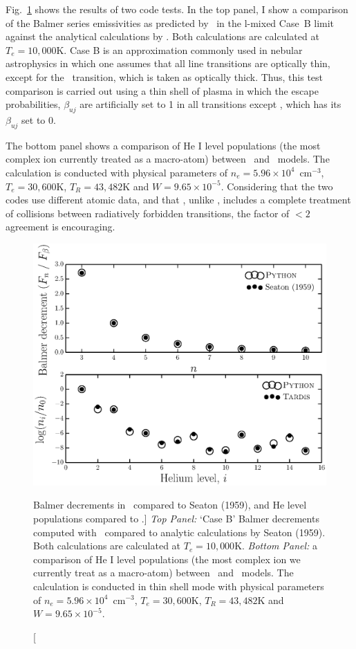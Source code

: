 Fig.~\ref{fig:caseb_tests} shows the results of two code tests. 
In the top panel, I show a comparison of the Balmer series 
emissivities as predicted by \py\ in the l-mixed Case~B limit against the
analytical calculations by \cite{seaton1959}. 
Both calculations are calculated at $T_e=10,000$K.
Case B is an approximation commonly used in nebular astrophysics 
\citep[see e.g.][]{osterbrock} in which
one assumes that all line transitions are optically thin, except
for the \la\ transition, which is taken as optically thick.
Thus, this test comparison is carried out using a thin shell
of plasma in which the escape probabilities, $\beta_{uj}$ 
are artificially set to 1 in all transitions except \la, which
has its $\beta_{uj}$ set to 0.

The bottom panel shows a comparison of He I level populations 
(the most complex ion currently 
treated as a macro-atom) between \py\ and \tar\ models.
The calculation is conducted with physical parameters of $n_e=5.96\times10^4$~cm$^{-3}$,
$T_e=30,600$K, $T_R=43,482$K and $W=9.65\times10^{-5}$. 
Considering that the two codes use different atomic data, and that
\tar, unlike \py, includes a 
complete treatment of collisions between 
radiatively forbidden transitions, the factor of 
$<2$ agreement is encouraging. 
\index{\tar}
\begin{figure}
\centering
\includegraphics[width=1.0\textwidth]{figures/05-cvpaper/fig_caseb_tardis.eps}
\caption
[Balmer decrements in \py\ compared to Seaton (1959), and He level populations
compared to \tar.]
{
{\sl Top Panel:} `Case B' Balmer decrements computed 
with \py\ compared to analytic calculations
by Seaton (1959). Both calculations are calculated at $T_e=10,000$K.
{\sl Bottom Panel:}  a comparison of He I level populations (the most complex ion we currently 
treat as a macro-atom) between \py\ and \tar\ models. 
The calculation is conducted in thin shell mode
with physical parameters of $n_e=5.96\times10^4$~cm$^{-3}$,
$T_e=30,600$K, $T_R=43,482$K and $W=9.65\times10^{-5}$. 
}
\label{fig:caseb_tests}
\end{figure}

